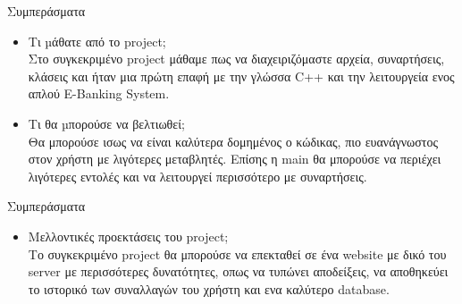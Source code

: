 \documentclass{beamer}
\begin{document}
\begin{frame}{Συμπεράσματα}
\begin{itemize}
  \item Τι µάθατε από το project;
  \vspace{0.2cm}
  \\ Στο συγκεκριμένο project μάθαμε πως να διαχειριζόμαστε αρχεία, συναρτήσεις, κλάσεις και ήταν μια πρώτη επαφή με την γλώσσα C++ και την λειτουργεία ενος απλού E-Banking System.
  \vspace{0.5cm}
  \item Τι θα µπορούσε να βελτιωθεί;
  \vspace{0.2cm}
  \\ Θα μπορούσε ισως να είναι καλύτερα δομημένος ο κώδικας, πιο ευανάγνωστος στον χρήστη με λιγότερες μεταβλητές. Επίσης η main θα μπορούσε να περιέχει λιγότερες εντολές και να λειτουργεί περισσότερο με συναρτήσεις.
  
\end{itemize}
\end{frame}

\begin{frame}{Συμπεράσματα}
\begin{itemize}
  
  \item Μελλοντικές προεκτάσεις του project;
  \vspace{0.2cm}
  \\ Το συγκεκριμένο project θα μπορούσε να επεκταθεί σε ένα website με δικό του server με περισσότερες δυνατότητες, οπως να τυπώνει αποδείξεις, να αποθηκεύει το ιστορικό των συναλλαγών του χρήστη και ενα καλύτερο database.
\end{itemize}
\end{frame}
\end{document}
